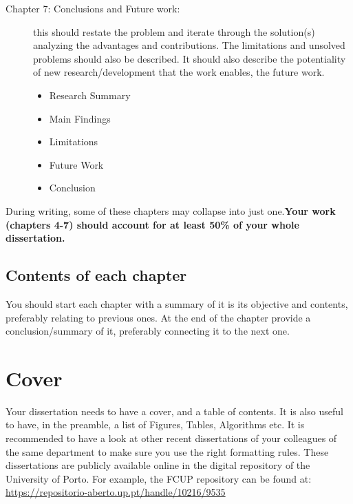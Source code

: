 \begin{description}
\item[Chapter 7: Conclusions and Future work:] 
         this should restate the problem and iterate through the solution(s) analyzing the advantages and contributions. The limitations and unsolved problems should also be described.
         It should also describe the potentiality of new research/development that the work enables, the future work.
   \begin{itemize}
      \item Research Summary
      \item Main Findings
      \item Limitations
      \item Future Work
      \item Conclusion
   \end{itemize}
\end{description}
During writing, some of these chapters may collapse into just one.\textbf{Your work (chapters 4-7) should account for at least 50\% of your whole dissertation.}

\subsection{Contents of each chapter}
You should start each chapter with a summary of it is its objective and contents, preferably relating to previous ones. At the end of the chapter provide a conclusion/summary of it, preferably connecting it to the next one.

\section{Cover}
 Your dissertation needs to have a cover, and a table of contents. It is also useful to have, in the
preamble, a list of Figures, Tables, Algorithms etc. It is recommended to have a look at other recent
dissertations of your colleagues of the same department to make sure you use the right formatting
rules. These dissertations are publicly available online in the digital repository of the University of
Porto. For example, the FCUP repository can be found at:
\url{https://repositorio-aberto.up.pt/handle/10216/9535}


